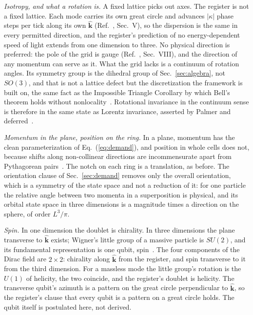 \documentclass[aps,prd,twocolumn,superscriptaddress,nofootinbib]{revtex4-2}
\begin{document}
\textit{Isotropy, and what a rotation is.} A fixed lattice picks out axes. The register is not a fixed lattice. Each mode carries its own great circle and advances $|\kappa|$ phase steps per tick along its own $\hat{\mathbf{k}}$ (Ref.~\cite{korytko2026c}, Sec.~V), so the dispersion is the same in every permitted direction, and the register's prediction of no energy-dependent speed of light extends from one dimension to three. No physical direction is preferred: the pole of the grid is gauge (Ref.~\cite{korytko2026c}, Sec.~VIII), and the direction of any momentum can serve as it. What the grid lacks is a continuum of rotation angles. Its symmetry group is the dihedral group of Sec.~\ref{sec:algebra}, not $SO(3)$, and that is not a lattice defect but the discretization the framework is built on, the same fact as the Impossible Triangle Corollary by which Bell's theorem holds without nonlocality~\cite{palmer2020,palmer2026b}. Rotational invariance in the continuum sense is therefore in the same state as Lorentz invariance, asserted by Palmer and deferred~\cite{palmer2026c}.

\textit{Momentum in the plane, position on the ring.} In a plane, momentum has the clean parameterization of Eq.~(\ref{eq:demand}), and position in whole cells does not, because shifts along non-collinear directions are incommensurate apart from Pythagorean pairs~\cite{korytko2026c}. The notch on each ring is a translation, as before. The orientation clause of Sec.~\ref{sec:demand} removes only the overall orientation, which is a symmetry of the state space and not a reduction of it: for one particle the relative angle between two momenta in a superposition is physical, and its orbital state space in three dimensions is a magnitude times a direction on the sphere, of order $L^3/\pi$.

\textit{Spin.} In one dimension the doublet is chirality. In three dimensions the plane transverse to $\hat{\mathbf{k}}$ exists; Wigner's little group of a massive particle is $SU(2)$, and its fundamental representation is one qubit, spin~\cite{weinberg1995}. The four components of the Dirac field are $2\times2$: chirality along $\hat{\mathbf{k}}$ from the register, and spin transverse to it from the third dimension. For a massless mode the little group's rotation is the $U(1)$ of helicity, the two coincide, and the register's doublet is helicity. The transverse qubit's azimuth is a pattern on the great circle perpendicular to $\hat{\mathbf{k}}$, so the register's clause that every qubit is a pattern on a great circle holds. The qubit itself is postulated here, not derived.
\end{document}
